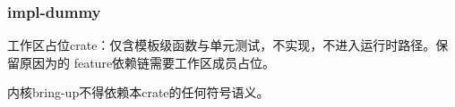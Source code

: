 
\subsubsection{impl-dummy}

工作区占位crate：仅含模板级函数与单元测试，不实现，不进入运行时路径。保留原因为的 feature依赖链需要工作区成员占位。

内核bring-up不得依赖本crate的任何符号语义。
